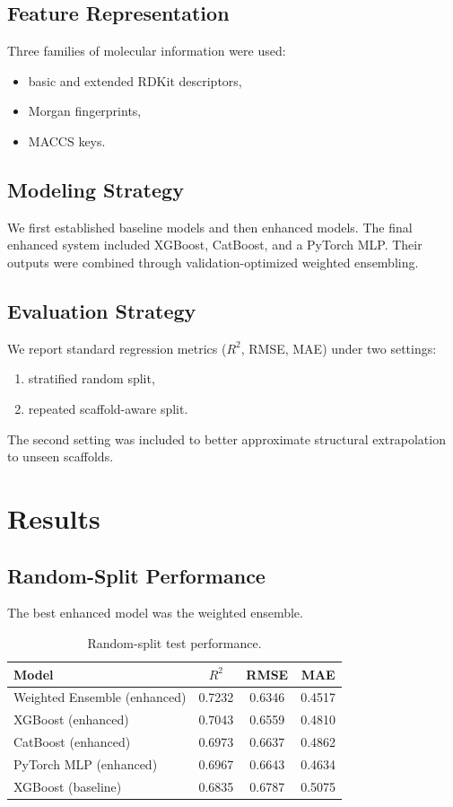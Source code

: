 \documentclass[11pt,a4paper]{article}
\begin{document}
\subsection{Feature Representation}
Three families of molecular information were used:
\begin{itemize}
    \item basic and extended RDKit descriptors,
    \item Morgan fingerprints,
    \item MACCS keys.
\end{itemize}

\subsection{Modeling Strategy}
We first established baseline models and then enhanced models. The final enhanced system included XGBoost, CatBoost, and a PyTorch MLP. Their outputs were combined through validation-optimized weighted ensembling.

\subsection{Evaluation Strategy}
We report standard regression metrics ($R^2$, RMSE, MAE) under two settings:
\begin{enumerate}
    \item stratified random split,
    \item repeated scaffold-aware split.
\end{enumerate}
The second setting was included to better approximate structural extrapolation to unseen scaffolds.

\section{Results}
\subsection{Random-Split Performance}
The best enhanced model was the weighted ensemble.

\begin{table}[H]
\centering
\caption{Random-split test performance.}
\begin{tabular}{lccc}
\toprule
Model & $R^2$ & RMSE & MAE \\
\midrule
Weighted Ensemble (enhanced) & 0.7232 & 0.6346 & 0.4517 \\
XGBoost (enhanced) & 0.7043 & 0.6559 & 0.4810 \\
CatBoost (enhanced) & 0.6973 & 0.6637 & 0.4862 \\
PyTorch MLP (enhanced) & 0.6967 & 0.6643 & 0.4634 \\
XGBoost (baseline) & 0.6835 & 0.6787 & 0.5075 \\
\bottomrule
\end{tabular}
\end{table}
\end{document}
